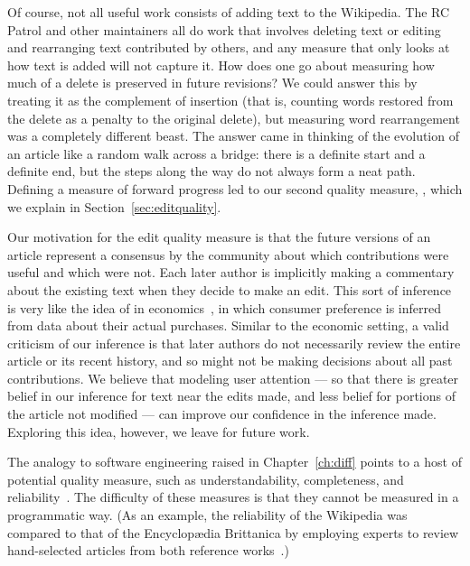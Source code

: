 Of course, not all useful work consists of adding text to the Wikipedia.
The RC Patrol and other maintainers all do work that involves
deleting text or editing and rearranging text contributed by others,
and any measure that only looks at how text is added will not capture it.
How does one go about measuring how much of a delete is preserved
in future revisions?
We could answer this by treating it as the complement of insertion
(that is, counting words restored from the delete as a
penalty to the original delete), but measuring word rearrangement
was a completely different beast.
The answer came in thinking of the evolution of an article
like a random walk across a bridge: there is a definite start and a
definite end, but the steps along the way do not always form a neat path.
Defining a measure of forward progress led to our second
quality measure, , which we explain in
Section~\ref{sec:editquality}.

Our motivation for the edit quality measure is that the future
versions of an article represent a consensus by the community about
which contributions were useful and which were not.
Each later author is implicitly making a commentary about the
existing text when they decide to make an edit.
This sort of inference is very like the idea of
 in economics~\cite{Samuelson1938,Varian2006},
in which consumer preference is inferred from data about their
actual purchases.
Similar to the economic setting, a valid criticism of our inference
is that later authors do not necessarily review the entire article
or its recent history, and so might not be making decisions about
all past contributions.
We believe that modeling user attention --- so that there is greater
belief in our inference for text near the edits made, and less belief
for portions of the article not modified ---
can improve our confidence in the inference made.
Exploring this idea, however, we leave for future work.

The analogy to software engineering raised in Chapter~\ref{ch:diff}
points to a host of potential quality measure, such as
understandability, completeness, and reliability~\cite{wiki:SoftwareQuality}.
The difficulty of these measures is that they cannot be measured
in a programmatic way.
(As an example, the reliability of the Wikipedia was compared to that
of the Encyclop{\ae}dia Brittanica by employing experts to review
hand-selected articles from both reference works~\cite{Giles2005}.)

